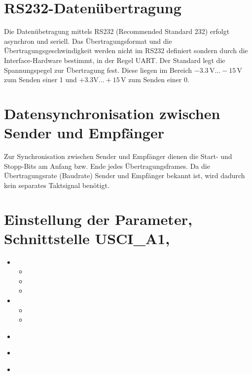 \documentclass[a4paper, 11pt]{article}
\begin{document}
  
  \clearpage
  \setcounter{page}{1}

  \section{RS232-Datenübertragung}
  \label{sec:1}
  Die Datenübetragung mittels RS232 (Recommended Standard 232) erfolgt asynchron
  und seriell. Das Übertragungsformat und die Übertragungsgeschwindigkeit werden
  nicht im RS232 definiert sondern durch die Interface-Hardware
  bestimmt, in der Regel UART. Der Standard legt die Spannungspegel zur
  Übertragung fest. Diese liegen im Bereich $-3.3 \, \si{\volt} ... -15 \,
  \si{\volt}$ zum Senden einer 1 und $+3.3 \si{\volt} ... +15 \, \si{\volt}$ zum
  Senden einer 0.

  \section{Datensynchronisation zwischen Sender und Empfänger}
  Zur Synchronisation zwischen Sender und Empfänger dienen die Start- und
  Stopp-Bits am Anfang bzw. Ende jedes Übertragungsframes. Da die
  Übertragungsrate (Baudrate) Sender und Empfänger bekannt ist, wird dadurch
  kein separates Taktsignal benötigt.

  \section{Einstellung der Parameter, Schnittstelle USCI\_A1, }
  
  \begin{itemize}
  \item[]{
      \begin{itemize}
        \item [] 
        \item [] 
        \item [] 
      \end{itemize}
    }

   \item[]{
      \begin{itemize}
        \item [] 
        \item [] 
      \end{itemize}
    }

   \item[]{
       
    }

   \item[]{
    }

   \item[]{
       
    }


  \end{itemize}
\end{document}
